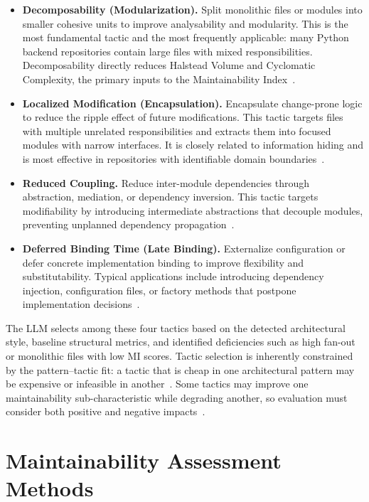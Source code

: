 \begin{itemize}
    \item \textbf{Decomposability (Modularization).} Split monolithic files or modules into smaller cohesive units to improve analysability and modularity. This is the most fundamental tactic and the most frequently applicable: many Python backend repositories contain large files with mixed responsibilities. Decomposability directly reduces Halstead Volume and Cyclomatic Complexity, the primary inputs to the Maintainability Index~\cite{rahmati2021ensuring}.

    \item \textbf{Localized Modification (Encapsulation).} Encapsulate change-prone logic to reduce the ripple effect of future modifications. This tactic targets files with multiple unrelated responsibilities and extracts them into focused modules with narrow interfaces. It is closely related to information hiding and is most effective in repositories with identifiable domain boundaries~\cite{kim2009qualitydriven}.

    \item \textbf{Reduced Coupling.} Reduce inter-module dependencies through abstraction, mediation, or dependency inversion. This tactic targets modifiability by introducing intermediate abstractions that decouple modules, preventing unplanned dependency propagation~\cite{kim2009qualitydriven}.

    \item \textbf{Deferred Binding Time (Late Binding).} Externalize configuration or defer concrete implementation binding to improve flexibility and substitutability. Typical applications include introducing dependency injection, configuration files, or factory methods that postpone implementation decisions~\cite{rahmati2021ensuring}.
\end{itemize}

The LLM selects among these four tactics based on the detected architectural style, baseline structural metrics, and identified deficiencies such as high fan-out or monolithic files with low MI scores. Tactic selection is inherently constrained by the pattern--tactic fit: a tactic that is cheap in one architectural pattern may be expensive or infeasible in another~\cite{harrison2010how}. Some tactics may improve one maintainability sub-characteristic while degrading another, so evaluation must consider both positive and negative impacts~\cite{bi2021mining}.

\section{Maintainability Assessment Methods}

